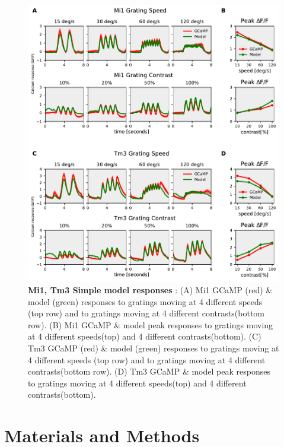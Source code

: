 \documentclass[9pt,lineno]{elife}
\begin{document}
\begin{figure}
\begin{fullwidth}
\includegraphics[width=0.84\linewidth]{figure9}
\caption{\textbf{Mi1, Tm3 Simple model responses} : (A) Mi1 GCaMP (red) \& model (green) responses to gratings moving at 4 different speeds (top row) and to gratings moving at 4 different contrasts(bottom row). (B) Mi1 GCaMP \& model peak responses to gratings moving at 4 different speeds(top) and 4 different contrasts(bottom). (C) Tm3 GCaMP (red) \& model (green) responses to gratings moving at 4 different speeds (top row) and to gratings moving at 4 different contrasts(bottom row). (D) Tm3 GCaMP \& model peak responses to gratings moving at 4 different speeds(top) and 4 different contrasts(bottom).}

\label{Mi1Tm3model}
	
\end{fullwidth}
\end{figure} 




\section{Materials and Methods}
\end{document}
